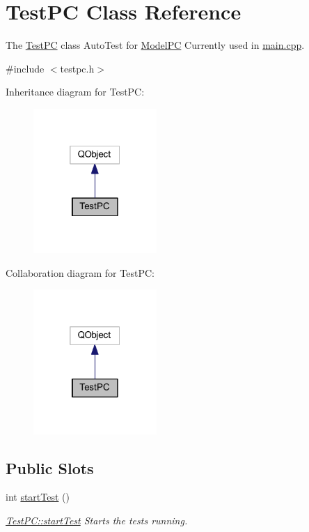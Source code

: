 \hypertarget{class_test_p_c}{}\section{Test\+PC Class Reference}
\label{class_test_p_c}


The \mbox{\hyperlink{class_test_p_c}{Test\+PC}} class Auto\+Test for \mbox{\hyperlink{class_model_p_c}{Model\+PC}} Currently used in \mbox{\hyperlink{main_8cpp}{main.\+cpp}}.  




{\ttfamily \#include $<$testpc.\+h$>$}



Inheritance diagram for Test\+PC\+:
\nopagebreak
\begin{figure}[H]
\begin{center}
\leavevmode
\includegraphics[width=133pt]{class_test_p_c__inherit__graph}
\end{center}
\end{figure}


Collaboration diagram for Test\+PC\+:
\nopagebreak
\begin{figure}[H]
\begin{center}
\leavevmode
\includegraphics[width=133pt]{class_test_p_c__coll__graph}
\end{center}
\end{figure}
\subsection*{Public Slots}
\begin{DoxyCompactItemize}
\item 
int \mbox{\hyperlink{class_test_p_c_ad0d724439a65d183d3d336b667cb867b}{start\+Test}} ()
\begin{DoxyCompactList}\small\item\em \mbox{\hyperlink{class_test_p_c_ad0d724439a65d183d3d336b667cb867b}{Test\+P\+C\+::start\+Test}} Starts the tests running. \end{DoxyCompactList}\end{DoxyCompactItemize}
